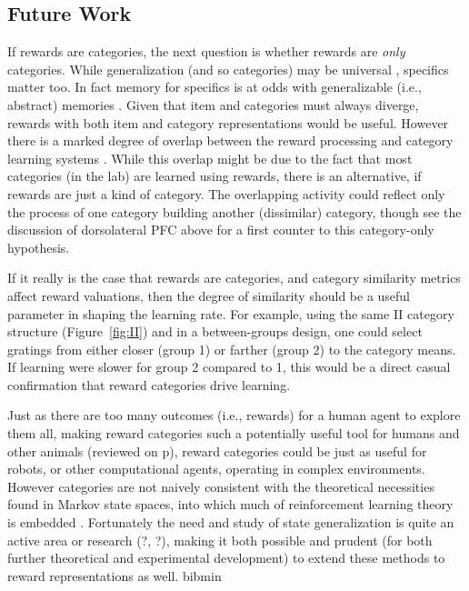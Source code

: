 \documentclass[doc,12pt]{apa}        %
\begin{document}
\subsection{Future Work}
\label{sub:future}
If rewards are categories, the next question is whether rewards are \emph{only} categories.  While generalization (and so categories) may be universal \cite{Shepard:1987p9102}, specifics matter too.  In fact memory for specifics is at odds with generalizable (i.e., abstract) memories \cite{Atallah:2004p5466}. Given that item and categories must always diverge, rewards with both item and category representations would be useful.  However there is a marked degree of overlap between the reward processing and category learning systems \cite{Seger:2010p7189,Ashby:2011p9148}.  While this overlap might be due to the fact that most categories (in the lab) are learned using rewards, there is an alternative, if rewards are just a kind of category.  The overlapping activity could reflect only the process of one category building another (dissimilar) category, though see the discussion of dorsolateral PFC above for a first counter to this category-only hypothesis.

If it really is the case that rewards are categories, and category similarity metrics affect reward valuations, then the degree of similarity should be a useful parameter in shaping the learning rate.  For example, using the same II category structure (Figure~\ref{fig:II}) and in a between-groups design, one could select gratings from either closer (group 1) or farther (group 2) to the category means. If learning were slower for group 2 compared to 1, this would be a direct casual confirmation that reward categories drive learning. 

Just as there are too many outcomes (i.e., rewards) for a human agent to explore them all, making reward categories such a potentially useful tool for humans and other animals (reviewed on p\pageref{sub:gen}), reward categories could be just as useful for robots, or other computational agents, operating in complex environments.   However categories are not naively consistent with the theoretical necessities found in Markov state spaces, into which much of reinforcement learning theory is embedded \cite{Sutton:1998p9247}.  Fortunately the need and study of state generalization is quite an active area or research (?, ?), making it both possible and prudent (for both further theoretical and experimental development) to extend these methods to reward representations as well. 
\clearpage
\newpage
 {bibmin}
\end{document}
